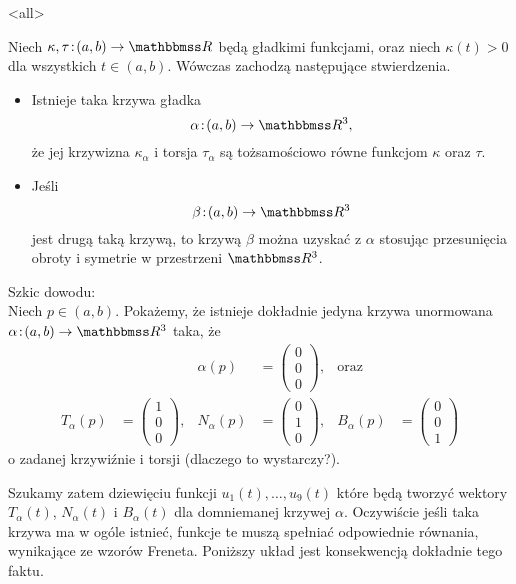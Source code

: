 \mode<all>{}
\begin{frame}[<+->]
\begin{twierdzenie}[Klasyfikacyjne]
Niech $\kappa, \tau\colon (a,b)\to \R$ będą gładkimi funkcjami, oraz niech $\kappa(t)>0$ dla wszystkich $t\in (a,b)$. Wówczas zachodzą następujące stwierdzenia.
\begin{itemize}
\item Istnieje taka krzywa gładka \[\alpha\colon(a,b)\to\R^3,\] że jej krzywizna $\kappa_\alpha$ i torsja $\tau_\alpha$ są tożsamościowo równe funkcjom $\kappa$ oraz $\tau$. 
\item Jeśli \[\beta\colon (a,b)\to \R^3\] jest drugą taką krzywą, to krzywą $\beta$ można uzyskać z $\alpha$ stosując przesunięcia obroty i symetrie w przestrzeni $\R^3$.
\end{itemize}

\end{twierdzenie}

\end{frame}
\begin{frame}[<+->]

\textcolor{ared}{Szkic dowodu:}\pause\\
Niech $p\in (a,b)$. Pokażemy, że istnieje dokładnie jedyna krzywa unormowana $\alpha\colon(a,b)\to \R^3$ taka, że 
\pause\begin{align*}
&&\alpha(p)&=
\left(\!\!\begin{array}{c}
0\\0\\0
\end{array}\!\!\right)\!,&\text{oraz}\\
T_\alpha(p)&=\left(\!\!\begin{array}{c}
1\\0\\0
\end{array}\!\!\right)\!,& 
N_\alpha(p)&=\left(\!\!\begin{array}{c}
0\\1\\0
\end{array}\!\!\right)\!,& 
B_\alpha(p)&=\left(\!\!\begin{array}{c}
0\\0\\1
\end{array}\!\!\right)
\label{eqn:warunek_poczatkowy}
\end{align*}
o zadanej krzywiźnie i torsji (dlaczego to wystarczy?).

\end{frame}
Szukamy zatem dziewięciu funkcji $u_1(t),\ldots,u_9(t)$ które będą tworzyć wektory $T_\alpha(t)$, $N_\alpha(t)$ i $B_\alpha(t)$ dla domniemanej krzywej $\alpha$. Oczywiście jeśli taka krzywa ma w ogóle istnieć, funkcje te muszą spełniać odpowiednie równania, wynikające ze wzorów Freneta. Poniższy układ jest konsekwencją dokładnie tego faktu.

